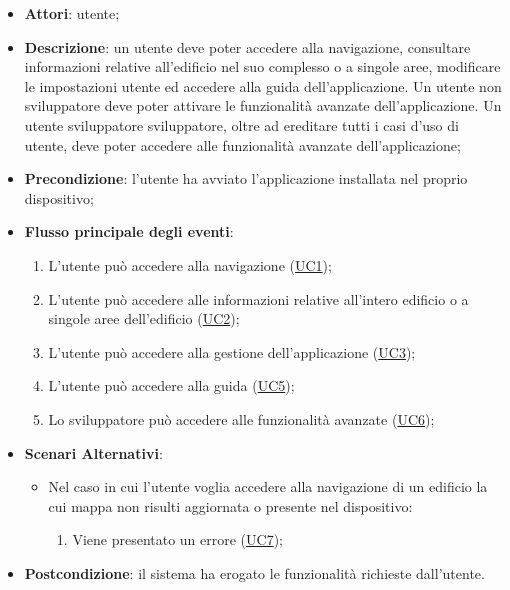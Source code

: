 \documentclass[../AnalisiDeiRequisiti.tex]{subfiles}
\begin{document}
\begin{itemize}
\item \textbf{Attori}: utente;
\item \textbf{Descrizione}: un utente deve poter accedere alla navigazione, consultare informazioni relative all'edificio nel suo complesso o a singole aree, modificare le impostazioni utente ed accedere alla guida dell'applicazione. Un utente non sviluppatore deve poter attivare le funzionalità avanzate dell'applicazione. Un utente sviluppatore sviluppatore, oltre ad ereditare tutti i casi d'uso di utente, deve poter accedere alle funzionalità avanzate dell'applicazione; 
      \item \textbf{Precondizione}: l'utente ha avviato l'applicazione installata nel proprio dispositivo;

        \item \textbf{Flusso principale degli eventi}:
          \begin{enumerate}
          \item L'utente può accedere alla navigazione (\hyperlink{UC1}{UC1});
          \item L'utente può accedere alle informazioni relative all'intero edificio o a singole aree dell'edificio (\hyperlink{UC2}{UC2});
          \item L'utente può accedere alla gestione dell'applicazione (\hyperlink{UC3}{UC3});
          \item L'utente può accedere alla guida (\hyperlink{UC5}{UC5});
          \item Lo sviluppatore può accedere alle funzionalità avanzate (\hyperlink{UC6}{UC6});

      \end{enumerate}
    \item \textbf{Scenari Alternativi}:
      	\begin{itemize}
			\item Nel caso in cui l'utente voglia accedere alla navigazione di un edificio la cui mappa non risulti aggiornata o presente nel dispositivo:
			\begin{enumerate}
				\item Viene presentato un errore (\hyperlink{UC7}{UC7});
			\end{enumerate}
      	\end{itemize}
    \item \textbf{Postcondizione}: il sistema ha erogato le funzionalità richieste dall'utente.
  \end{itemize}
\hypertarget{UC1}{}
\end{document}
